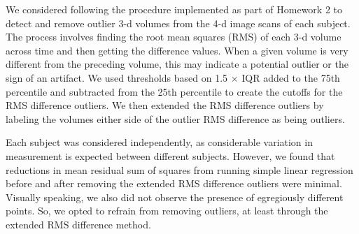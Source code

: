 
\par \indent We considered following the procedure implemented as part of 
Homework 2 to detect and remove outlier 3-d volumes from the 4-d image scans
of each subject. The process involves finding the root mean squares (RMS) of 
each 3-d volume across time and then getting the difference values. When a 
given volume is very different from the preceding volume, this may indicate a 
potential outlier or the sign of an artifact. We used thresholds based on 1.5 
$\times$ IQR added to the 75th percentile and subtracted from the 25th 
percentile to create the cutoffs for the RMS difference outliers. We then 
extended the RMS difference outliers by labeling the volumes either side of 
the outlier RMS difference as being outliers. 

\par Each subject was considered independently, as considerable variation in 
measurement is expected between different subjects. However, we found that 
reductions in mean residual sum of squares from running simple linear 
regression before and after removing the extended RMS difference outliers were 
minimal. Visually speaking, we also did not observe the presence of egregiously
different points. So, we opted to refrain from removing outliers, at least 
through the extended RMS difference method. 

